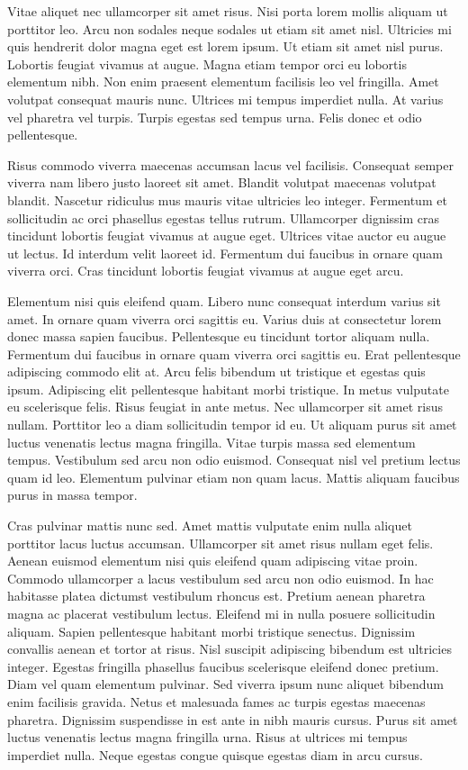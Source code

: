 \documentclass[a4paper,12pt,oneside]{article}
\begin{document}
Vitae aliquet nec ullamcorper sit amet risus. Nisi porta lorem mollis aliquam ut porttitor leo. Arcu non sodales neque sodales ut etiam sit amet nisl. Ultricies mi quis hendrerit dolor magna eget est lorem ipsum. Ut etiam sit amet nisl purus. Lobortis feugiat vivamus at augue. Magna etiam tempor orci eu lobortis elementum nibh. Non enim praesent elementum facilisis leo vel fringilla. Amet volutpat consequat mauris nunc. Ultrices mi tempus imperdiet nulla. At varius vel pharetra vel turpis. Turpis egestas sed tempus urna. Felis donec et odio pellentesque.

Risus commodo viverra maecenas accumsan lacus vel facilisis. Consequat semper viverra nam libero justo laoreet sit amet. Blandit volutpat maecenas volutpat blandit. Nascetur ridiculus mus mauris vitae ultricies leo integer. Fermentum et sollicitudin ac orci phasellus egestas tellus rutrum. Ullamcorper dignissim cras tincidunt lobortis feugiat vivamus at augue eget. Ultrices vitae auctor eu augue ut lectus. Id interdum velit laoreet id. Fermentum dui faucibus in ornare quam viverra orci. Cras tincidunt lobortis feugiat vivamus at augue eget arcu.

Elementum nisi quis eleifend quam. Libero nunc consequat interdum varius sit amet. In ornare quam viverra orci sagittis eu. Varius duis at consectetur lorem donec massa sapien faucibus. Pellentesque eu tincidunt tortor aliquam nulla. Fermentum dui faucibus in ornare quam viverra orci sagittis eu. Erat pellentesque adipiscing commodo elit at. Arcu felis bibendum ut tristique et egestas quis ipsum. Adipiscing elit pellentesque habitant morbi tristique. In metus vulputate eu scelerisque felis. Risus feugiat in ante metus. Nec ullamcorper sit amet risus nullam. Porttitor leo a diam sollicitudin tempor id eu. Ut aliquam purus sit amet luctus venenatis lectus magna fringilla. Vitae turpis massa sed elementum tempus. Vestibulum sed arcu non odio euismod. Consequat nisl vel pretium lectus quam id leo. Elementum pulvinar etiam non quam lacus. Mattis aliquam faucibus purus in massa tempor.

Cras pulvinar mattis nunc sed. Amet mattis vulputate enim nulla aliquet porttitor lacus luctus accumsan. Ullamcorper sit amet risus nullam eget felis. Aenean euismod elementum nisi quis eleifend quam adipiscing vitae proin. Commodo ullamcorper a lacus vestibulum sed arcu non odio euismod. In hac habitasse platea dictumst vestibulum rhoncus est. Pretium aenean pharetra magna ac placerat vestibulum lectus. Eleifend mi in nulla posuere sollicitudin aliquam. Sapien pellentesque habitant morbi tristique senectus. Dignissim convallis aenean et tortor at risus. Nisl suscipit adipiscing bibendum est ultricies integer. Egestas fringilla phasellus faucibus scelerisque eleifend donec pretium. Diam vel quam elementum pulvinar. Sed viverra ipsum nunc aliquet bibendum enim facilisis gravida. Netus et malesuada fames ac turpis egestas maecenas pharetra. Dignissim suspendisse in est ante in nibh mauris cursus. Purus sit amet luctus venenatis lectus magna fringilla urna. Risus at ultrices mi tempus imperdiet nulla. Neque egestas congue quisque egestas diam in arcu cursus.
\end{document}

